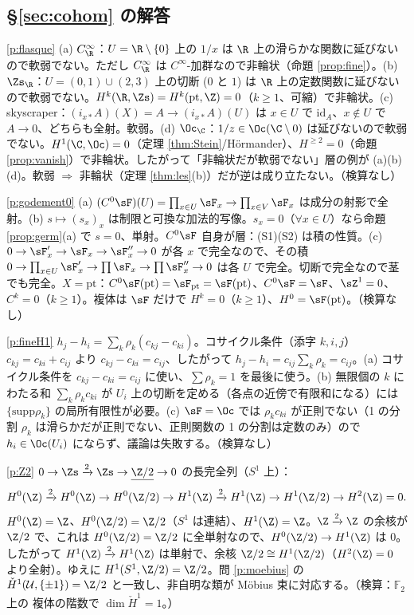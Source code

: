 \subsection*{§\ref{sec:cohom} の解答}
\begin{sol}{\ref{p:flasque}}
(a) $C^\infty_\R$：$U=\R\setminus\{0\}$ 上の $1/x$ は $\R$ 上の滑らかな関数に延びないので軟弱でない。ただし $C^\infty_\R$ は $C^\infty$-加群なので非輪状（命題 \ref{prop:fine}）。(b) $\Zs_\R$：$U=(0,1)\cup(2,3)$ 上の切断 ($0$ と $1$) は $\R$ 上の定数関数に延びないので軟弱でない。$H^k(\R,\Zs)=H^k(\mathrm{pt},\Z)=0$（$k\ge1$、可縮）で非輪状。(c) skyscraper：$(i_{x*}A)(X)=A\to(i_{x*}A)(U)$ は $x\in U$ で $\mathrm{id}_A$、$x\notin U$ で $A\to0$、どちらも全射。軟弱。(d) $\Oc_\C$：$1/z\in\Oc(\C\setminus0)$ は延びないので軟弱でない。$H^1(\C,\Oc)=0$（定理 \ref{thm:Stein}/Hörmander）、$H^{\ge2}=0$（命題 \ref{prop:vanish}）で非輪状。したがって「非輪状だが軟弱でない」層の例が (a)(b)(d)。軟弱 $\Rightarrow$ 非輪状（定理 \ref{thm:les}(b)）だが逆は成り立たない。（検算なし）
\end{sol}
\begin{sol}{\ref{p:godement0}}
(a) $(C^0\sF)(U)=\prod_{x\in U}\sF_x\to\prod_{x\in V}\sF_x$ は成分の射影で全射。(b) $s\mapsto(s_x)_x$ は制限と可換な加法的写像。$s_x=0$（$\forall x\in U$）なら命題 \ref{prop:germ}(a) で $s=0$、単射。$C^0\sF$ 自身が層：(S1)(S2) は積の性質。(c) $0\to\sF'_x\to\sF_x\to\sF''_x\to0$ が各 $x$ で完全なので、その積 $0\to\prod_{x\in U}\sF'_x\to\prod\sF_x\to\prod\sF''_x\to0$ は各 $U$ で完全。切断で完全なので茎でも完全。$X=\mathrm{pt}$：$C^0\sF(\mathrm{pt})=\sF_{\mathrm{pt}}=\sF(\mathrm{pt})$、$C^0\sF=\sF$、$\sZ^1=0$、$C^k=0$（$k\ge1$）。複体は $\sF$ だけで $H^k=0$（$k\ge1$）、$H^0=\sF(\mathrm{pt})$。（検算なし）
\end{sol}
\begin{sol}{\ref{p:fineH1}}
$h_j-h_i=\sum_k\rho_k(c_{kj}-c_{ki})$。コサイクル条件（添字 $k,i,j$）$c_{kj}=c_{ki}+c_{ij}$ より $c_{kj}-c_{ki}=c_{ij}$、したがって $h_j-h_i=c_{ij}\sum_k\rho_k=c_{ij}$。(a) コサイクル条件を $c_{kj}-c_{ki}=c_{ij}$ に使い、$\sum\rho_k=1$ を最後に使う。(b) 無限個の $k$ にわたる和 $\sum_k\rho_kc_{ki}$ が $U_i$ 上の切断を定める（各点の近傍で有限和になる）には $\{\mathrm{supp}\rho_k\}$ の局所有限性が必要。(c) $\sF=\Oc$ では $\rho_kc_{ki}$ が正則でない（1 の分割 $\rho_k$ は滑らかだが正則でない、正則関数の 1 の分割は定数のみ）ので $h_i\in\Oc(U_i)$ にならず、議論は失敗する。（検算なし）
\end{sol}
\begin{sol}{\ref{p:Z2}}
$0\to\Zs\xrightarrow{2}\Zs\to\underline{\Z/2}\to0$ の長完全列（$S^1$ 上）：
\[
H^0(\Z)\xrightarrow{2}H^0(\Z)\to H^0(\Z/2)\to H^1(\Z)\xrightarrow{2}H^1(\Z)\to H^1(\Z/2)\to H^2(\Z)=0.
\]
$H^0(\Z)=\Z$、$H^0(\Z/2)=\Z/2$（$S^1$ は連結）、$H^1(\Z)=\Z$。$\Z\xrightarrow{2}\Z$ の余核が $\Z/2$ で、これは $H^0(\Z/2)=\Z/2$ に全単射なので、$H^0(\Z/2)\to H^1(\Z)$ は $0$。したがって $H^1(\Z)\xrightarrow{2}H^1(\Z)$ は単射で、余核 $\Z/2\cong H^1(\Z/2)$（$H^2(\Z)=0$ より全射）。ゆえに $H^1(S^1,\Z/2)=\Z/2$。問 \ref{p:moebius} の $\check H^1(\mathcal U,\{\pm1\})=\Z/2$ と一致し、非自明な類が Möbius 束に対応する。（検算：$\mathbb F_2$ 上の \Cech{} 複体の階数で $\dim\check H^1=1$。）
\end{sol}
